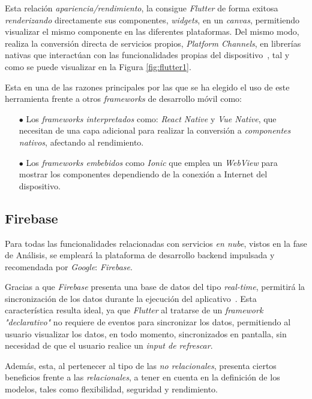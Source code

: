 Esta relación \textit{apariencia/rendimiento}, la consigue \textit{Flutter} de forma exitosa
\textit{renderizando} directamente sus componentes, 
\textit{widgets}, en un \textit{canvas}, permitiendo visualizar el mismo componente en las diferentes plataformas.
Del mismo modo, realiza la conversión directa de servicios propios, \textit{Platform Channels}, en librerías nativas que
interactúan con las funcionalidades propias del dispositivo~\cite{leler2019s}, 
tal y como se puede visualizar en la Figura \ref{fig:flutter1}.

Esta en una de las razones principales por las que se ha elegido el uso de este herramienta frente a otros 
\textit{frameworks} de desarrollo móvil como: 

\begin{itemize}
    \item[$\bullet$] Los \textit{frameworks interpretados} como: \textit{React Native} y \textit{Vue Native}, 
    que necesitan de una
    capa adicional para realizar la conversión a \textit{componentes nativos}, afectando al rendimiento.
    \item[$\bullet$] Los \textit{frameworks embebidos} como
    \textit{Ionic} que emplea un \textit{WebView} para mostrar los componentes dependiendo de la conexión a 
    Internet del dispositivo.
 \end{itemize}

 \subsection{Firebase}
 Para todas las funcionalidades relacionadas con servicios \textit{en nube}, vistos en la fase de Análisis,
 se empleará la plataforma de desarrollo backend impulsada y recomendada por \textit{Google}: \textit{Firebase}.

Gracias a que \textit{Firebase} presenta una base de datos del tipo \textit{real-time}, permitirá 
la sincronización de los datos durante la ejecución del
aplicativo~\cite{khawas2018application}. Esta característica resulta ideal, ya que
\textit{Flutter} al tratarse de un \textit{framework "declarativo"} no requiere de eventos para
sincronizar los datos, permitiendo al usuario visualizar los datos, en todo momento, sincronizados en pantalla,
sin necesidad de que el usuario realice un \textit{input de refrescar}.

Además, esta, al pertenecer al tipo de las \textit{no relacionales}, presenta ciertos beneficios frente a 
las \textit{relacionales},
a tener en cuenta en la definición de los modelos, tales como flexibilidad, seguridad y rendimiento.

